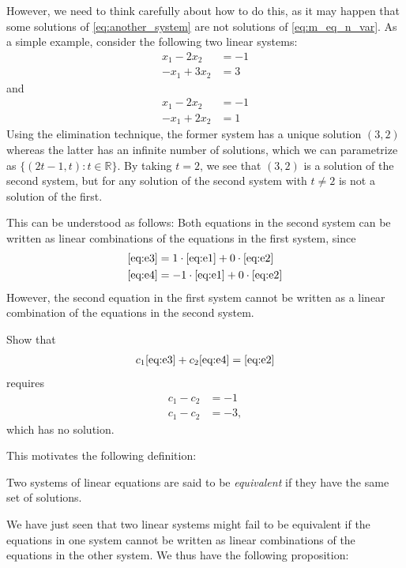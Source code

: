 \documentclass[12pt,letterpaper,reqno]{article}
\numberwithin{equation}{section}
\newcommand{\ti}[1]{\textit{#1}}
\begin{document}
However, we need to think carefully about how to do this, as it may happen that some solutions of \eqref{eq:another_system} are not solutions of \eqref{eq:m_eq_n_var}. As a simple example, consider the following two linear systems:
\begin{align}
		x_1-2x_2&=-1 \label{eq:e1}\\
		-x_1+3x_2&=3 \label{eq:e2}
\end{align} 
and 
\begin{align}
		x_1-2x_2&=-1 \label{eq:e3}\\
		-x_1+2x_2&=1 \label{eq:e4}
\end{align}
Using the elimination technique, the former system has a unique solution $(3,2)$ whereas the latter has an infinite number of solutions, which we can parametrize as $\{(2t-1,t):t \in \mathbb{R}\}$. By taking $t=2$, we see that $(3,2)$ is a solution of the second system, but for any solution of the second system with $t \neq 2$ is not a solution of the first.

This can be understood as follows: Both equations in the second system can be written as linear combinations of the equations in the first system, since 
\begin{align*}
	\eqref{eq:e3}&=1\cdot \eqref{eq:e1}+0\cdot \eqref{eq:e2} \\
	\eqref{eq:e4}&=-1\cdot \eqref{eq:e1}+0\cdot \eqref{eq:e2}
\end{align*}
However, the second equation in the first system  cannot be written as a linear combination of the equations in the second system.

\begin{exercise}
Show that 
\begin{align*}
	c_1 \eqref{eq:e3} + c_2 \eqref{eq:e4} = \eqref{eq:e2}
\end{align*}
requires 
\begin{align*}
	c_1-c_2&=-1 \\
	c_1-c_2&=-3,
\end{align*}	
which has no solution.
\end{exercise}

This motivates the following definition:

\begin{defn} \label{def: equivalent_linear_systems}
	Two systems of linear equations are said to be \ti{equivalent} if they have the same set of solutions.
\end{defn}

We have just seen that two linear systems might fail to be equivalent if the equations in one system cannot be written as linear combinations of the equations in the other system. We thus have the following proposition:
\end{document}
